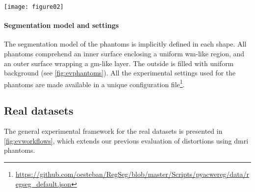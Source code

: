 \begin{figure*}
\texttt{[image: figure02]}
\caption{Evaluation of \regseg{} using phantom data according to the following instrumental workflow.
  1) The reference surfaces $\gammaset_R$ are triangularized meshes extracted from the four binary shapes (i.e., ``box'', ``ball'', ``L'', ``gyrus'').
  2) A ground-truth displacement field was generated as described in \autoref{sec:digital_phantoms}, and applied to warp
      $\gammaset_R$, thereby obtaining $\gammaset_\text{true}$.
  3) After being warped, $\gammaset_\text{true}$ were projected onto the corresponding discrete 3D volume and downsampled to create partial volume effects at two resolutions,
     i.e.,  and , thereby producing sets of tissue fractions maps.
  4) The tissue fractions were fed into a \acrfull*{mr} simulator, which generated \acrfull*{t1} and \acrfull*{t2} -like images at the
     two possible resolutions.
  5) The \regseg{} tool was applied using the warped test images as multispectral moving images and $\gammaset_R$ as shape priors.
  6) The agreement between the surfaces fitted by \regseg{} ($\hat{\gammaset}_\text{test}$) and $\gammaset_\text{true}$ were assessed
     visually using automatically generated visual reports and quantitativelly with the Hausdorff distance between the
     corresponding surfaces.}\label{fig:evphantoms}
\end{figure*}

\paragraph*{Segmentation model and settings}
The segmentation model of the phantoms is implicitly defined in each shape.
All phantoms comprehend an inner surface enclosing a uniform \gls*{wm}-like region,
  and an outer surface wrapping a \gls*{gm}-like layer.
The outside is filled with uniform background (see \autoref{fig:evphantoms}).
All the experimental settings used for the phantoms are made available in
  a unique configuration file\footnote{\url{https://github.com/oesteban/RegSeg/blob/master/Scripts/pyacwereg/data/regseg_default.json}}.

\subsection{Real datasets} \label{sec:human_connectome}
The general experimental framework for the real datasets is presented in \autoref{fig:evworkflows},
which extends our previous evaluation \citep{esteban_simulationbased_2014} of distortions
  using \gls*{dmri} phantoms.


